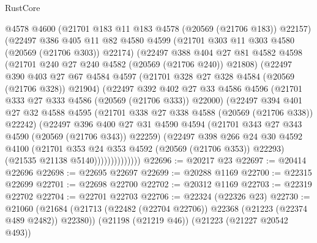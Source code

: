 \begin{lexlean}{RustCore}
\begin{coremodule}
                @4578
                @4600
                (@21701 @183 @11 @183 @4578 (@20569 (@21706 @183)) @22157)
                (@22497
                  @386
                  @405
                  @11
                  @82
                  @4580
                  @4599
                  (@21701 @303 @11 @303 @4580 (@20569 (@21706 @303)) @22174)
                  (@22497
                    @388
                    @404
                    @27
                    @81
                    @4582
                    @4598
                    (@21701 @240 @27 @240 @4582 (@20569 (@21706 @240)) @21808)
                    (@22497
                      @390
                      @403
                      @27
                      @67
                      @4584
                      @4597
                      (@21701 @328 @27 @328 @4584 (@20569 (@21706 @328)) @21904)
                      (@22497
                        @392
                        @402
                        @27
                        @33
                        @4586
                        @4596
                        (@21701 @333 @27 @333 @4586 (@20569 (@21706 @333)) @22000)
                        (@22497
                          @394
                          @401
                          @27
                          @32
                          @4588
                          @4595
                          (@21701 @338 @27 @338 @4588 (@20569 (@21706 @338)) @22242)
                          (@22497
                            @396
                            @400
                            @27
                            @31
                            @4590
                            @4594
                            (@21701 @343 @27 @343 @4590 (@20569 (@21706 @343)) @22259)
                            (@22497
                              @398
                              @266
                              @24
                              @30
                              @4592
                              @4100
                              (@21701 @353 @24 @353 @4592 (@20569 (@21706 @353)) @22293)
                              (@21535 @21138 @5140))))))))))))))
@22696 := @20217 @23
@22697 := @20414 @22696
@22698 := @22695 @22697
@22699 := @20288 @1169
@22700 := @22315 @22699
@22701 := @22698 @22700
@22702 := @20312 @1169
@22703 := @22319 @22702
@22704 := @22701 @22703
@22706 := @22324 (@22326 @23)
@22730 := @21060
    (@21684 (@21713 (@22482 (@22704 @22706)) @22368 (@21223 (@22374 @489 @2482)) @22380))
    (@21198 (@21219 @46))
    (@21223 (@21227 @20542 @493))

\end{coremodule}
\end{lexlean}
